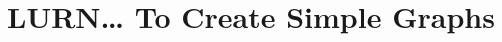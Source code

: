 \chapter{LURN\ldots{} To Create Simple Graphs} 
\label{SimpleGraphs} 
 
 
 
















































